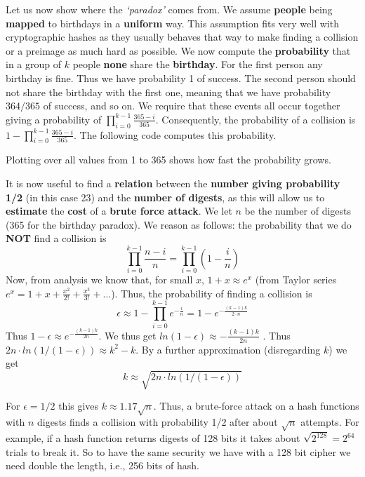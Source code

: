 Let us now show where the \textit{‘paradox’} comes from. We assume \textbf{people} being \textbf{mapped} to birthdays in a \textbf{uniform} way. This assumption fits very well with cryptographic hashes as they usually behaves that way to make finding a collision or a preimage as much hard as possible. We now compute the \textbf{probability} that in a group of $k$ people \textbf{none} share the \textbf{birthday}. For the first person any birthday is fine. Thus we have probability 1 of success. The second person should not share the birthday with the first one, meaning that we have probability $364/365$ of success, and so on. We require that these events all occur together giving a probability of $\prod_{i=0}^{k-1} \frac{365-i}{365}$. Consequently, the probability of a collision is $1- \prod_{i=0}^{k-1} \frac{365-i}{365}$. The following code computes this probability.


Plotting over all values from 1 to 365 shows how fast the probability grows.


It is now useful to find a \textbf{relation} between the \textbf{number giving probability 1/2} (in this case 23) and the \textbf{number of digests}, as this will allow us to \textbf{estimate} the \textbf{cost} of a \textbf{brute force attack}. We let $n$ be the number of digests (365 for the birthday paradox). We reason as follows: the probability that we do \textbf{NOT} find a collision is  $$\prod_{i=0}^{k-1} \frac{n-i}{n} = \prod_{i=0}^{k-1} \left(1 - \frac{i}{n}\right)$$ Now, from analysis we know that, for small $x$, $1+x \approx e^x$ (from Taylor series $e^x = 1 + x + \frac{x^2}{2!} + \frac{x^3}{3!} +\ldots$). Thus, the probability of finding a collision is $$\epsilon \approx 1 - \prod_{i=0}^{k-1} e^{-\frac{i}{n}} = 1 - e^{-\frac{(k-1)k}{2 \cdot n}}$$ Thus $1- \epsilon \approx e^{-\frac{(k-1)k}{2 n}}$. We thus get $ln(1-\epsilon) \approx -\frac{(k-1)k}{2 n}$ . Thus $2 n \cdot ln(1/(1-\epsilon)) \approx k^2 - k$. By a further approximation (disregarding $k$) we get $$k \approx \sqrt{2 n  \cdot ln(1/(1-\epsilon))}$$

For $\epsilon = 1/2$ this gives $k \approx 1.17 \sqrt{n}$. Thus, a brute-force attack on a hash functions with $n$ digests finds a collision with probability 1/2 after about $\sqrt{n}$ attempts. For example, if a hash function returns digests of 128 bits it takes about $\sqrt{2^{128}} = 2^{64}$ trials to break it. So to have the same security we have with a 128 bit cipher we need double the length, i.e., 256 bits of hash.

